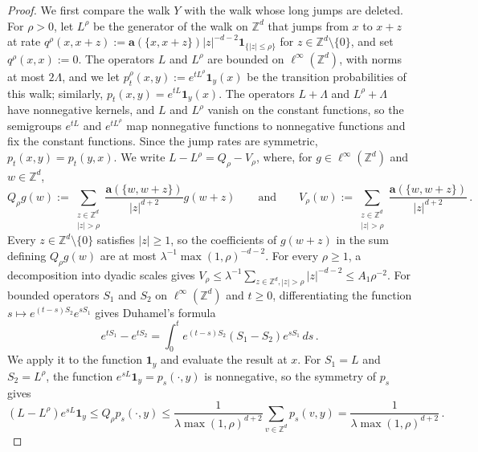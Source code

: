 \documentclass[11pt]{amsart}
\numberwithin{equation}{section}
\newcommand{\Z}{\mathbb{Z}}
\newcommand{\ba}{\mathbf{a}}
\begin{document}
\begin{proof}
We first compare the walk $Y$ with the walk whose long jumps are deleted.
For $\rho > 0$, let $L^\rho$ be the generator of the walk on $\Z^d$ that jumps from $x$ to $x + z$ at rate $q^\rho(x, x + z) := \ba(\{x, x+z\}) |z|^{-d-2} \mathbf{1}_{\{|z| \leq \rho\}}$ for $z \in \Z^d \setminus \{0\}$, and set $q^\rho(x, x) := 0$.
The operators $L$ and $L^\rho$ are bounded on $\ell^\infty(\Z^d)$, with norms at most $2 \Lambda$, and we let $p^\rho_t(x,y) := e^{t L^\rho} \mathbf{1}_y(x)$ be the transition probabilities of this walk; similarly, $p_t(x,y) = e^{tL} \mathbf{1}_y(x)$.
The operators $L + \Lambda$ and $L^\rho + \Lambda$ have nonnegative kernels, and $L$ and $L^\rho$ vanish on the constant functions, so the semigroups $e^{tL}$ and $e^{t L^\rho}$ map nonnegative functions to nonnegative functions and fix the constant functions.
Since the jump rates are symmetric, $p_t(x,y) = p_t(y,x)$.
We write $L - L^\rho = Q_\rho - V_\rho$, where, for $g \in \ell^\infty(\Z^d)$ and $w \in \Z^d$,
\begin{equation*}
    Q_\rho g(w) := \sum_{\substack{z \in \Z^d \\ |z| > \rho}} \frac{\ba(\{w, w+z\})}{|z|^{d+2}} g(w + z)
    \qquad \text{and} \qquad
    V_\rho(w) := \sum_{\substack{z \in \Z^d \\ |z| > \rho}} \frac{\ba(\{w, w+z\})}{|z|^{d+2}}\,.
\end{equation*}
Every $z \in \Z^d \setminus \{0\}$ satisfies $|z| \geq 1$, so the coefficients of $g(w+z)$ in the sum defining $Q_\rho g(w)$ are at most $\lambda^{-1} \max(1, \rho)^{-d-2}$.
For every $\rho \geq 1$, a decomposition into dyadic scales gives $V_\rho \leq \lambda^{-1} \sum_{z \in \Z^d, |z| > \rho} |z|^{-d-2} \leq A_1 \rho^{-2}$.
For bounded operators $S_1$ and $S_2$ on $\ell^\infty(\Z^d)$ and $t \geq 0$, differentiating the function $s \mapsto e^{(t-s) S_2} e^{s S_1}$ gives Duhamel's formula
\begin{equation*}
    e^{t S_1} - e^{t S_2} = \int_0^t e^{(t-s) S_2} (S_1 - S_2) e^{s S_1} \, ds\,.
\end{equation*}
We apply it to the function $\mathbf{1}_y$ and evaluate the result at $x$.
For $S_1 = L$ and $S_2 = L^\rho$, the function $e^{sL} \mathbf{1}_y = p_s(\cdot, y)$ is nonnegative, so the symmetry of $p_s$ gives
\begin{equation*}
    (L - L^\rho) e^{sL} \mathbf{1}_y \leq Q_\rho p_s(\cdot, y) \leq \frac{1}{\lambda \max(1, \rho)^{d+2}} \sum_{v \in \Z^d} p_s(v, y) = \frac{1}{\lambda \max(1, \rho)^{d+2}}\,.
\end{equation*}

\end{proof}
\end{document}
